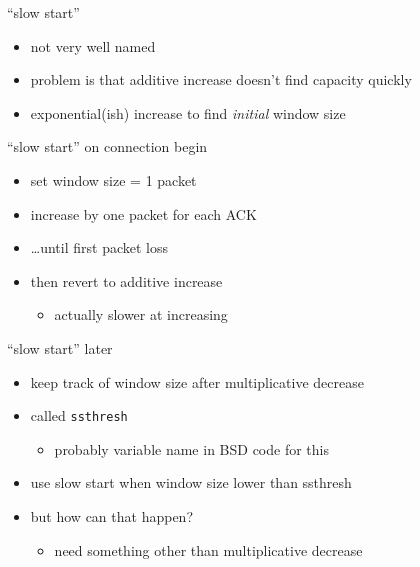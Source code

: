 \begin{frame}{``slow start''}
    \begin{itemize}
    \item not very well named
    \vspace{.5cm}
    \item problem is that additive increase doesn't find capacity quickly
    \item exponential(ish) increase to find \textit{initial} window size
    \end{itemize}
\end{frame}

\begin{frame}{``slow start'' on connection begin}
    \begin{itemize}
    \item set window size = 1 packet
    \item increase by one packet for each ACK
    \item \ldots until first packet loss
    \vspace{.5cm}
    \item then revert to additive increase
        \begin{itemize}
        \item actually slower at increasing
        \end{itemize}
    \end{itemize}
\end{frame}

\begin{frame}{``slow start'' later}
    \begin{itemize}
    \item keep track of window size after multiplicative decrease
    \item called \texttt{ssthresh}
        \begin{itemize}
        \item probably variable name in BSD code for this
        \end{itemize}
    \item use slow start when window size lower than ssthresh
    \vspace{.5cm}
    \item but how can that happen?
        \begin{itemize}
        \item need something other than multiplicative decrease
        \end{itemize}
    \end{itemize}
\end{frame}

